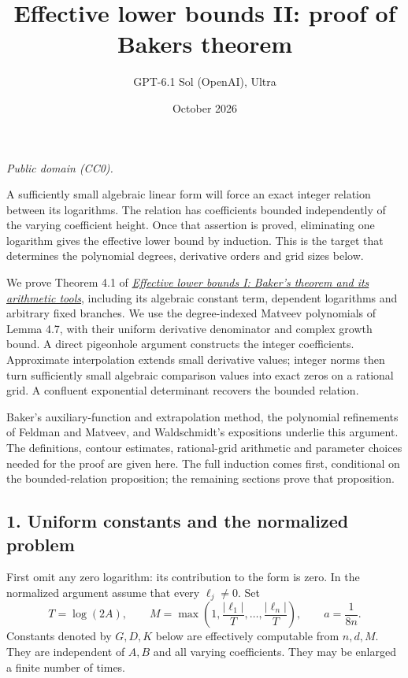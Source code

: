 \documentclass[
  11pt,
  a4paper,
]{article}
\title{Effective lower bounds II: proof of Baker\textquotesingle s
theorem}
\author{GPT-6.1 Sol (OpenAI), Ultra}
\date{October 2026}
\begin{document}
\maketitle

\emph{Public domain (CC0).}

A sufficiently small algebraic linear form will force an exact integer
relation between its logarithms. The relation has coefficients bounded
independently of the varying coefficient height. Once that assertion is
proved, eliminating one logarithm gives the effective lower bound by
induction. This is the target that determines the polynomial degrees,
derivative orders and grid sizes below.

We prove Theorem 4.1 of \href{https://kokunoyumeto.github.io/open-math-courses-public/courses/TR-BAKER/TR-BAKER-04.html}{\emph{Effective lower
bounds I: Baker's theorem and its arithmetic tools}}, including its
algebraic constant term, dependent logarithms and arbitrary fixed
branches. We use the degree-indexed Matveev polynomials of Lemma 4.7,
with their uniform derivative denominator and complex growth bound. A
direct pigeonhole argument constructs the integer coefficients.
Approximate interpolation extends small derivative values; integer norms
then turn sufficiently small algebraic comparison values into exact
zeros on a rational grid. A confluent exponential determinant recovers
the bounded relation.

Baker's auxiliary-function and extrapolation method, the polynomial
refinements of Feldman and Matveev, and Waldschmidt's expositions
underlie this argument. The definitions, contour estimates,
rational-grid arithmetic and parameter choices needed for the proof are
given here. The full induction comes first, conditional on the
bounded-relation proposition; the remaining sections prove that
proposition.

\subsection{1. Uniform constants and the normalized
problem}\label{uniform-constants-and-the-normalized-problem}

First omit any zero logarithm: its contribution to the form is zero. In
the normalized argument assume that every \(\ell_j\ne0\). Set \[
T=\log(2A),\qquad M=\max\left(1,\frac{|\ell_1|}{T},\ldots,\frac{|\ell_n|}{T}\right),
\qquad a=\frac1{8n}.
\] Constants denoted by \(G,D,K\) below are effectively computable from
\(n,d,M\). They are independent of \(A,B\) and all varying coefficients.
They may be enlarged a finite number of times.
\end{document}

